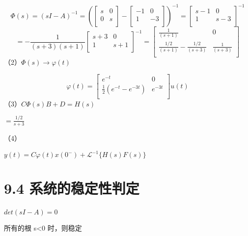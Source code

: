 \documentclass[UTF8]{ctexart}
\begin{document}
\begin{equation}
  \Phi (s)=(sI-A)^{-1}=
  \left(
    \left[   
      \begin{matrix}
      s & 0 \\
      0 & s \\
      \end{matrix}
    \right]-
    \left[   
      \begin{matrix}
      -1 & 0 \\
      1 & -3 \\
      \end{matrix}
    \right]
  \right)^{-1}
= \left[   
  \begin{matrix}
  s-1 & 0 \\
  1 & s-3 \\
  \end{matrix}
 \right]^{-1}  
 \nonumber
\end{equation}
\begin{equation}
 = -\frac{1}{(s+3)(s+1)}
 \left[   
  \begin{matrix}
  s+3 & 0 \\
  1 & s+1 \\
  \end{matrix}
 \right]^{-1} 
 = \left[   
  \begin{matrix}
    \frac{1}{(s+1)} & 0 \\
    \frac{1/2}{(s+1)}-\frac{1/2}{(s+3)} & \frac{1}{(s+3)} \\
  \end{matrix}
 \right]
 \nonumber
\end{equation}
\quad （2）$\Phi (s) \longrightarrow \varphi (t)$ \par
\begin{equation}
  \varphi (t)= 
  \left[   
   \begin{matrix}
   e^{-t} & 0 \\
   \frac{1}{2}(e^{-t}-e^{-3t}) & e^{-3t} \\
   \end{matrix}
  \right]u(t) 
  \nonumber
 \end{equation}
 \quad （3）$C\Phi (s)B+D=H(s) $ \par
 \qquad \qquad \qquad \qquad $=\frac{1/2}{s+3}$ \par
（4） \par
 $y(t)=C\varphi (t)x(0^-)+\mathscr{L}^{-1}\{H(s)F(s)\} $  \par
\section{9.4 系统的稳定性判定}
$det(sI-A)=0$ \par
所有的根 s<0 时，则稳定
\end{document}
